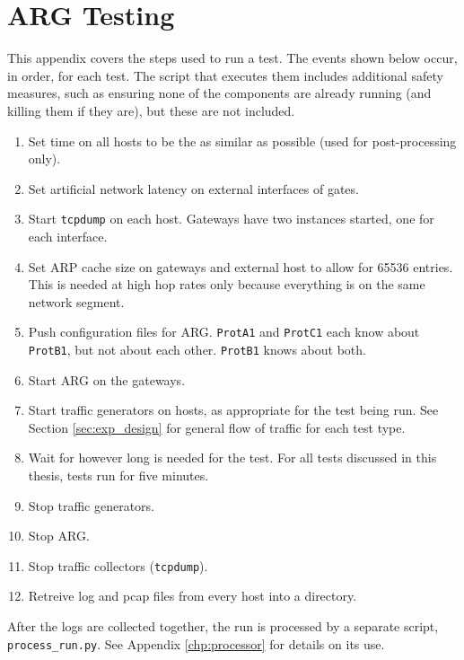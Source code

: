 \chapter{\ac{ARG} Testing}
\label{chp:testseq}
\par This appendix covers the steps used to run a test. The events shown below occur, in order, for each test. The script that executes them includes additional safety measures, such as ensuring none of the components are already running (and killing them if they are), but these are not included.

\begin{comment}
\section{Network Setup}
\par As Section \ref{sec:evaluation_technique} discusses, tests are run on a seven-node network, laid out as illustrated in Figure \ref{fig:argnetwork_app}.
\begin{figure}
	\centering
	\caption{ARG Network Layout Overview}
	\label{fig:argnetwork_app}
	\texttt{[image: thesis\_network]}
\end{figure}

\section{Test Sequence}
\end{comment}

\begin{enumerate}
\item Set time on all hosts to be the as similar as possible (used for post-processing only).
\item Set artificial network latency on external interfaces of gates.
\item Start \texttt{tcpdump} on each host. Gateways have two instances started, one for each interface. 
\item Set \ac{ARP} cache size on gateways and external host to allow for 65536 entries. This is needed at high hop rates only because everything is on the same network segment.
\item Push configuration files for \ac{ARG}. \texttt{ProtA1} and \texttt{ProtC1} each know about \texttt{ProtB1}, but not about each other. \texttt{ProtB1} knows about both.
\item Start \ac{ARG} on the gateways. 
\item Start traffic generators on hosts, as appropriate for the test being run. See Section \ref{sec:exp_design} for general flow of traffic for each test type.
\item Wait for however long is needed for the test. For all tests discussed in this thesis, tests run for five minutes.
\item Stop traffic generators.
\item Stop \ac{ARG}.
\item Stop traffic collectors (\texttt{tcpdump}).
\item Retreive log and pcap files from every host into a directory.
\end{enumerate}

\par After the logs are collected together, the run is processed by a separate script, \texttt{process\_run.py}. See Appendix \ref{chp:processor} for details on its use. 


